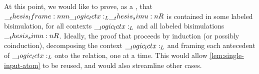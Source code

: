 


At this point, we would like to prove, as a , that $\lframe{\lctx_L}{\simu{R}}$ is contained in some labeled bisimulation, for all contexts $\__logic_lctx:_L$ and all labeled bisimulations $\__thesis_simu:n {R}$.
Ideally, the proof that proceeds by induction (or possibly coinduction), decomposing the context $\__logic_lctx:_L$ and framing each antecedent of $\__logic_lctx:_L$ onto the relation, one at a time.
This would allow \cref{lem:single-input-atom} to be reused, and would also streamline other cases.

